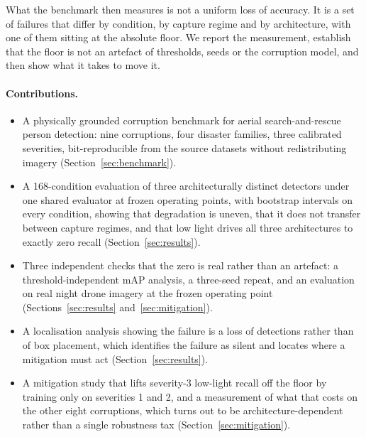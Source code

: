 What the benchmark then measures is not a uniform loss of accuracy. It
is a set of failures that differ by condition, by capture regime and by
architecture, with one of them sitting at the absolute floor. We report
the measurement, establish that the floor is not an artefact of
thresholds, seeds or the corruption model, and then show what it takes
to move it.

\paragraph{Contributions.}
\begin{itemize}\itemsep1pt \parskip0pt 
\item A physically grounded corruption benchmark for aerial
search-and-rescue person detection: nine corruptions, four disaster
families, three calibrated severities, bit-reproducible from the source
datasets without redistributing imagery
(Section~\ref{sec:benchmark}).
\item A 168-condition evaluation of three architecturally distinct
detectors under one shared evaluator at frozen operating points, with
bootstrap intervals on every condition, showing that degradation is
uneven, that it does not transfer between capture regimes, and that
low light drives all three architectures to exactly zero recall
(Section~\ref{sec:results}).
\item Three independent checks that the zero is real rather than an
artefact: a threshold-independent mAP analysis, a three-seed repeat, and
an evaluation on real night drone imagery at the frozen operating point
(Sections~\ref{sec:results} and~\ref{sec:mitigation}).
\item A localisation analysis showing the failure is a loss of
detections rather than of box placement, which identifies the failure as
silent and locates where a mitigation must act
(Section~\ref{sec:results}).
\item A mitigation study that lifts severity-3 low-light recall off the
floor by training only on severities 1 and 2, and a measurement of what
that costs on the other eight corruptions, which turns out to be
architecture-dependent rather than a single robustness tax
(Section~\ref{sec:mitigation}).
\end{itemize}
